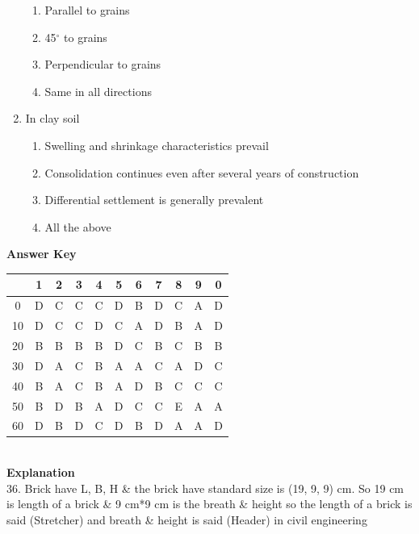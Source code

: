 \documentclass[11pt,a4paper]{article}
\begin{document}
\begin{enumerate}
\begin{enumerate}[label=\Alph*.]
\item{Parallel to grains}
\item{45$^\circ$ to grains}
\item{Perpendicular to grains}
\item{Same in all directions}
\end{enumerate}
\item{In clay soil}
\begin{enumerate}[label=\Alph*.]
\item{Swelling and shrinkage characteristics prevail}
\item{Consolidation continues even after several years of construction}
\item{Differential settlement is generally prevalent}
\item{All the above}
\end{enumerate}
\end{enumerate}
\textbf{Answer Key}
\begin{tabular}{ | c | c c c c c c c c c c | }
\hline
 & 1 & 2 & 3 & 4 & 5 & 6 & 7 & 8 & 9 & 0 \\
\hline
0 & D & C & C & C & D & B & D & C & A & D \\
10 & D & C & C & D & C & A & D & B & A & D \\
20 & B & B & B & B & D & C & B & C & B & B \\
30 & D & A & C & B & A & A & C & A & D & C \\
40 & B & A & C & B & A & D & B & C & C & C \\
50 & B & D & B & A & D & C & C & E & A & A \\
60 & D & B & D & C & D & B & D & A & A & D \\
\hline
\end{tabular}
\\\textbf{Explanation}\\
36.
Brick have L, B, H \& the brick have standard size is (19, 9, 9) cm. So 19 cm is length of a brick \& 9 cm*9 cm is the breath \& height so the length of a brick is said (Stretcher) and breath \& height is said (Header) in civil engineering

\clearpage
\end{document}
